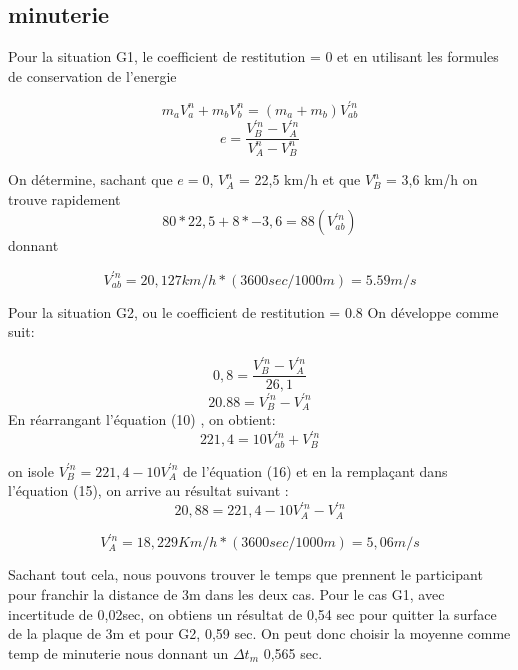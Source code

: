 \documentclass{article}
\begin{document}
 
 \subsection{minuterie}
 Pour la situation G1, le coefficient de restitution = 0 et
 en utilisant les formules de conservation de l'energie 
 
 \begin{equation}
 m_{a}V_{a}^{n} + m_{b}V_{b}^{n} =( m_{a} + m_{b})V_{ab}^{'n} 
 \end{equation}
 \begin{equation}
 e = \frac {V_{B}^{'n}-V_{A}^{'n}}{V_{A}^{n}-V_{B}^{n}} 
\end{equation}  

 On détermine, sachant que $ e = 0$, $ V_{A}^{n}$ = 22,5 km/h et que  $V_{B}^{n}$ = 3,6 km/h on trouve rapidement
 \begin{equation}
  80*22,5 +8*-3,6 = 88(V_{ab}^{'n})
\end{equation}  
donnant

\begin{equation}
V_{ab}^{'n} = 20,127 km/h * (3600sec/1000m) = 5.59 m/s
\end{equation}


\vspace*{4mm}
 Pour la situation G2, ou le coefficient de restitution = 0.8 On développe comme suit:

 \begin{equation}
 0,8 = \frac{V_{B}^{'n}-V_{A}^{'n}}{26,1}
\end{equation} 
 \begin{equation}
 20.88 = V_{B}^{'n}-V_{A}^{'n} 
\end{equation} 
En réarrangant l'équation (10) , on obtient:
 \begin{equation}
 221,4 = 10V_{ab}^{'n}+V_{B}^{'n}
\end{equation} 

on isole  $V_{B}^{'n} = 221,4 - 10V_{A}^{'n}$ de l'équation (16) et en la remplaçant dans l'équation (15), on arrive au résultat suivant :
\begin{equation}
  20,88 = {221,4 - 10V_{A}^{'n}-V_{A}^{'n}}
\end{equation}

\begin{equation}
  V_{A}^{'n} = 18,229 Km/h *(3600sec/1000m) = 5,06 m/s
\end{equation}
\vspace*{4mm}

Sachant tout cela, nous pouvons trouver le temps que prennent le participant pour franchir la distance de 3m dans les deux cas. Pour le cas G1, avec incertitude de 0,02sec, on obtiens un résultat de 0,54 sec pour quitter la surface de la plaque de 3m et pour G2, 0,59 sec. On peut donc choisir la moyenne comme temp de minuterie nous donnant un $\Delta t_{m}$ 0,565 sec.
 
\end{document}
